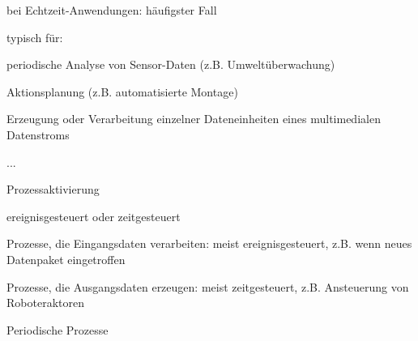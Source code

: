 \documentclass[a4paper]{article}
\begin{document}
\begin{multicols}{3}
    \begin{itemize*}
        \item
        bei Echtzeit-Anwendungen: häufigster Fall
        \item
        typisch für:
        \begin{enumerate*}

            \item periodische Analyse von Sensor-Daten (z.B. Umweltüberwachung)
            \item Aktionsplanung (z.B. automatisierte Montage)
            \item Erzeugung oder Verarbeitung einzelner Dateneinheiten eines multimedialen Datenstroms
            \item ...
        \end{enumerate*}
        \item
        Prozessaktivierung
        \begin{itemize*}
            \item ereignisgesteuert oder zeitgesteuert
            \item Prozesse, die Eingangsdaten verarbeiten: meist ereignisgesteuert, z.B. wenn neues Datenpaket eingetroffen
            \item Prozesse, die Ausgangsdaten erzeugen: meist zeitgesteuert, z.B. Ansteuerung von Roboteraktoren
        \end{itemize*}
    \end{itemize*}

    Periodische Prozesse


\end{multicols}
\end{document}

